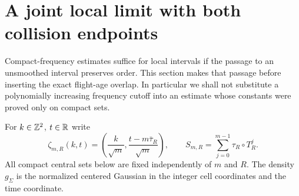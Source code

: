 \section{A joint local limit with both collision endpoints}
\label{sec:collision-mixing-local-limit}
Compact-frequency estimates suffice for local intervals if the passage
to an unsmoothed interval preserves order. This section makes that
passage before inserting the exact flight-age overlap. In particular
we shall not substitute a polynomially increasing frequency cutoff
into an estimate whose constants were proved only on compact sets.

For $k\in\mathbb Z^2$, $t\in\mathbb R$ write
\[
 \zeta_{m,R}(k,t)=
 \left(\frac{k}{\sqrt m},\frac{t-m\bar\tau_R}{\sqrt m}\right),
 \qquad S_{m,R}=\sum_{j=0}^{m-1}\tau_R\circ T_R^j.
\]
All compact central sets below are fixed independently of $m$ and $R$.
The density $g_\Sigma$ is the normalized centered Gaussian in the
integer cell coordinates and the time coordinate.

